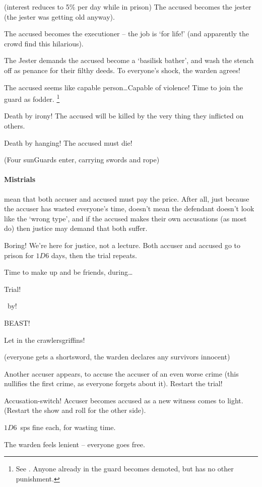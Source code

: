\begin{multicols}{2}
\begin{dlist}
    (interest reduces to 5\% per day while in prison)
  \else
    The accused becomes the jester (the jester was getting old anyway).
  \fi
  \item
    The accused becomes the executioner -- the job is `for life!' (and apparently the crowd find this hilarious).
  \item
    The Jester demands the accused become a `\gls{basilisk} bather', and wash the stench off  as penance for their filthy deeds.
    To everyone's shock, the \gls{warden} agrees!
  \item
  The accused seems like capable person\ldots Capable of violence!
  Time to join the \gls{guard} as fodder.%
  \footnote{See . Anyone already in the \gls{guard} becomes demoted, but has no other punishment.}
  \item
  Death by irony!
  The accused will be killed by the very thing they inflicted on others.
  \item
  Death by hanging!
  The accused must die!

  (Four \glspl{sunGuard} enter, carrying swords and rope)
\end{dlist}

\paragraph{Mistrials}
mean that both accuser and accused must pay the price.
After all, just because the accuser has wasted everyone's time, doesn't mean the defendant doesn't look like the `wrong type', and if the accused makes their own accusations (as most do) then justice may demand that both suffer.

\label{mistrials}
\begin{dlist}
  \item
  Boring!
  We're here for justice, not a lecture.
  Both accuser and accused go to prison for $1D6$ days, then the trial repeats.
  \item
  Time to make up and be friends, during\ldots

  Trial!

  ~by!

  BEAST!

  Let in the \ifodd\value{r4} \glspl{crawler}\else griffins\fi!

  (everyone gets a shortsword, the \gls{warden} declares any survivors innocent)
  \item
  Another accuser appears, to accuse the accuser of an even worse crime (this nullifies the first crime, as everyone forgets about it).
  Restart the trial!
  \item
  Accusation-switch!
  Accuser becomes accused as a new witness comes to light.
  (Restart the show and roll for the other side).
  \item
  $1D6$~\glspl{sp} fine each, for wasting time.
  \item
  The \gls{warden} feels lenient -- everyone goes free.
\end{dlist}

\end{multicols}

\encTownEvents

